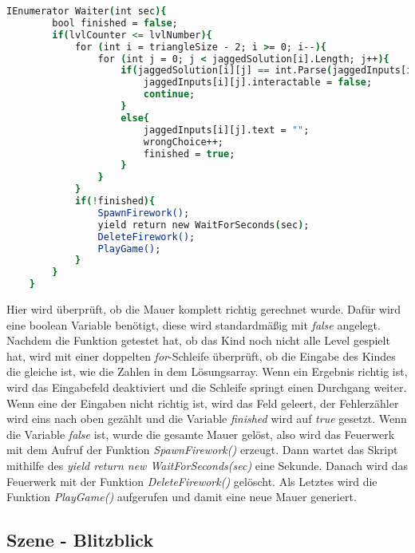 \begin{lstlisting}[language=csh, caption={Triangle.cs Waiter-Coroutine}]
	IEnumerator Waiter(int sec){
		bool finished = false;
		if(lvlCounter <= lvlNumber){
			for (int i = triangleSize - 2; i >= 0; i--){
				for (int j = 0; j < jaggedSolution[i].Length; j++){
					if(jaggedSolution[i][j] == int.Parse(jaggedInputs[i][j].text)){
						jaggedInputs[i][j].interactable = false;
						continue;
					}
					else{
						jaggedInputs[i][j].text = "";
						wrongChoice++;
						finished = true;
					}
				}
			}
			if(!finished){
				SpawnFirework();
				yield return new WaitForSeconds(sec);
				DeleteFirework();
				PlayGame();
			}
		}
	}
\end{lstlisting}
Hier wird überprüft, ob die Mauer komplett richtig gerechnet wurde. Dafür wird eine boolean Variable benötigt, diese wird standardmäßig mit \textit{false} angelegt. Nachdem die Funktion getestet hat, ob das Kind noch nicht alle Level gespielt hat, wird mit einer doppelten \textit{for}-Schleife überprüft, ob die Eingabe des Kindes die gleiche ist, wie die Zahlen in dem Lösungsarray. Wenn ein Ergebnis richtig ist, wird das Eingabefeld deaktiviert und die Schleife springt einen Durchgang weiter. Wenn eine der Eingaben nicht richtig ist, wird das Feld geleert, der Fehlerzähler wird eins nach oben gezählt und die Variable \textit{finished} wird auf \textit{true} gesetzt. Wenn die Variable \textit{false} ist, wurde die gesamte Mauer gelöst, also wird das Feuerwerk mit dem Aufruf der Funktion \textit{SpawnFirework()} erzeugt. Dann wartet das Skript mithilfe des \textit{yield return new WaitForSeconds(sec)} eine Sekunde. Danach wird das Feuerwerk mit der Funktion \textit{DeleteFirework()} gelöscht. Als Letztes wird die Funktion \textit{PlayGame()} aufgerufen und damit eine neue Mauer generiert.
\newpage
\subsection{Szene - Blitzblick}
